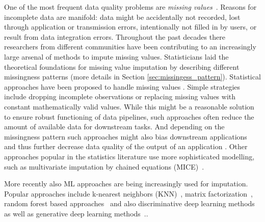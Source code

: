 One of the most frequent data quality problems are \emph{missing values}~\citep{Kumar}. Reasons for incomplete data are manifold: data might be accidentally not recorded, lost through application or transmission errors, intentionally not filled in by users, or result from data integration errors.
%
Throughout the past decades there researchers from different communities have been contributing to an increasingly large arsenal of methods to impute missing values. Statisticians laid the theoretical foundations for missing value imputation \citep{Rubin} by describing different missingness patterns (more details in Section \ref{sec:missingess_pattern}). Statistical approaches have been proposed to handle missing values \citep{Graham}. Simple strategies include dropping incomplete observations or replacing missing values with constant mathematically valid values. While this might be a reasonable solution to ensure robust functioning of data pipelines, such approaches often reduce the amount of available data for downstream tasks. And depending on the missingness pattern such approaches might also bias downstream applications~\citep{Stoyanovich2020,Yang2020} and thus further decrease data quality of the output of an application \citep{Little, Graham}. Other approaches popular in the statistics literature use more sophisticated modelling, such as multivariate imputation by chained equations (MICE)~\citep{Little,vanBuuren}.

More recently also ML approaches are being increasingly used for imputation. Popular approaches include k-nearest neighbors (KNN)~\citep{Batista2003}, matrix factorization~\citep{Troyanskaya2001,Koren2009,Mazumder2010}, random forest based approaches~\citep{Stekhoven2012} and also discriminative deep learning methods~\citep{Biessmann2018a} as well as generative deep learning methods~\citep{HIVAE,GAIN}..

%

